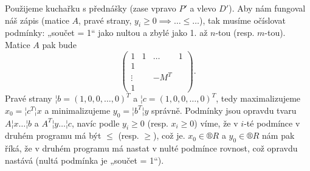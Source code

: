 \documentclass[12pt]{article}					%
\begin{document}
\begin{priklad}[2.1]
	\begin{dukazin}
		Použijeme kuchařku s přednášky (zase vpravo $P'$ a vlevo $D'$). Aby nám fungoval náš zápis (matice $A$, pravé strany, $y_i ≥ 0 \implies … ≤ …$), tak musíme očíslovat podmínky: „součet = 1“ jako nultou a zbylé jako 1. až $n$-tou (resp. $m$-tou). Matice $A$ pak bude
		$$ \begin{pmatrix} 1 & 1 & … & 1 \\ 1 \\ \vdots & & -M^T \\ 1 \end{pmatrix}. $$
		Pravé strany $¦b = (1, 0, 0, …, 0)^T$ a $¦c = (1, 0, 0, …, 0)^T$, tedy maximalizujeme $x_0 = ¦c^T¦x$ a minimalizujeme $y_0 = ¦b^T¦y$ správně. Podmínky jsou opravdu tvaru $A¦x … ¦b$ a $A^T ¦y … ¦c$, navíc podle $y_i ≥ 0$ (resp. $x_i ≥ 0$) víme, že v $i$-té podmínce v druhém programu má být $≤$ (resp. $≥$), což je. $x_0 \in ®R$ a $y_0 \in ®R$ nám pak říká, že v druhém programu má nastat v nulté podmínce rovnost, což opravdu nastává (nultá podmínka je „součet = 1“).
	\end{dukazin}
\end{priklad}
\end{document}
